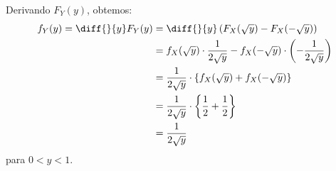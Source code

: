 \begin{example}
    Derivando $F_Y(y)$, obtemos:
    \begin{align*}
        f_Y(y) = \diff{}{y} F_Y(y)
        &= \diff{}{y} \left(F_X(\sqrt{y}) - F_X(-\sqrt{y})\right) \\
        &= f_X(\sqrt{y}) \cdot \frac{1}{2\sqrt{y}}
        - f_X(-\sqrt{y}) \cdot \left(-\frac{1}{2\sqrt{y}}\right) \\
        &= \frac{1}{2\sqrt{y}} \cdot
            \left\{f_X(\sqrt{y}) + f_X(-\sqrt{y})\right\} \\
        &= \frac{1}{2\sqrt{y}} \cdot
            \left\{\frac{1}{2} + \frac{1}{2}\right\} \\
        &= \frac{1}{2\sqrt{y}}
    \end{align*}
    para $0 < y < 1$.
\end{example}
